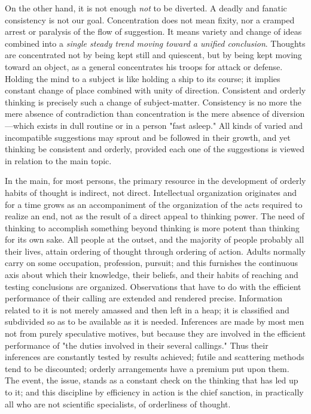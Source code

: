 \documentclass[letterpaper]{book}
\begin{document}
On the other hand, it is not enough \emph{not} to be diverted. A deadly
and fanatic consistency is not our goal. Concentration does not mean
fixity, nor a cramped arrest or paralysis of the flow of suggestion. It
means variety and change of ideas combined into a \emph{single steady
trend moving toward a unified conclusion}. Thoughts are concentrated not
by being kept still and quiescent, but by being kept moving toward an
object, as a general concentrates his troops for attack or defense.
Holding the mind to a subject is like holding a ship to its course; it
implies constant change of place combined with unity of direction.
Consistent and orderly thinking is precisely such a change of
subject-matter. Consistency is no more the mere absence of contradiction
than concentration is the mere absence of diversion---which exists in
dull routine or in a person "fast asleep." All kinds of varied and
incompatible suggestions may sprout and be followed in their growth, and
yet thinking be consistent and orderly, provided each one of the
suggestions is viewed in relation to the main topic.


In the main, for most persons, the primary
resource
in the development of orderly habits of thought is indirect, not direct.
Intellectual organization originates and for a time grows as an
accompaniment of the organization of the acts required to realize an
end, not as the result of a direct appeal to thinking power. The need of
thinking to accomplish something beyond thinking is more potent than
thinking for its own sake. All people at the outset, and the majority of
people probably all their lives, attain ordering of thought through
ordering of action. Adults normally carry on some occupation,
profession, pursuit; and this furnishes the continuous axis about which
their knowledge, their beliefs, and their habits of reaching and testing
conclusions are organized. Observations that have to do with the
efficient performance of their calling are extended and rendered
precise. Information related to it is not merely amassed and then left
in a heap; it is classified and subdivided so as to be available as it
is needed. Inferences are made by most men not from purely speculative
motives, but because they are involved in the efficient performance of
"the duties involved in their several callings." Thus their inferences
are constantly tested by results achieved; futile and scattering methods
tend to be discounted; orderly arrangements have a premium put upon
them. The event, the issue, stands as a constant check on the thinking
that has led up to it; and this discipline by efficiency in action is
the chief sanction, in practically all who are not scientific
specialists, of orderliness of thought.
\end{document}
